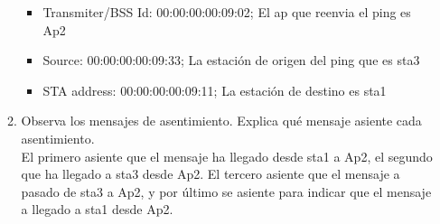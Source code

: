 \documentclass[12pt, a4paper]{report}
\begin{document}
\begin{enumerate}
\begin{enumerate}[label=\alph*)]
\begin{itemize}
			\item Transmiter/BSS Id: 00:00:00:00:09:02; El ap que reenvia el ping es Ap2\\
			\item Source: 00:00:00:00:09:33; La estación de origen del ping que es sta3\\
			\item STA address: 00:00:00:00:09:11; La estación de destino es sta1\\
		\end{itemize}
		\item Observa los mensajes de asentimiento. Explica qué mensaje asiente cada asentimiento.\\
		
		El primero asiente que el mensaje ha llegado desde sta1 a Ap2, el segundo que ha llegado a sta3 desde Ap2. El tercero asiente que el mensaje a pasado de sta3 a Ap2, y por último se asiente para indicar que el mensaje a llegado a sta1 desde Ap2.
	\end{enumerate}
\end{enumerate}
\end{document}
